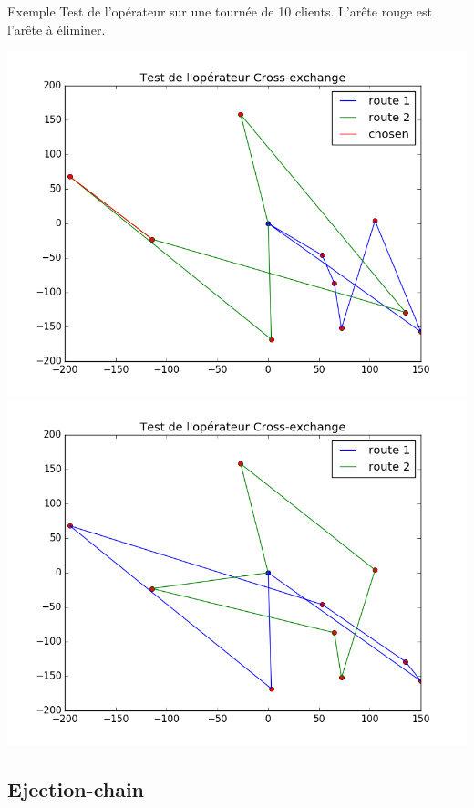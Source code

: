 \documentclass{beamer}
\begin{document}
\begin{frame}{Exemple}
Test de l'opérateur sur une tournée de 10 clients. L'arête rouge est l'arête à éliminer.

\begin{center}
\includegraphics[scale=0.28]{test2CE_init.png}
\includegraphics[scale=0.28]{test2CE_imp.png}
\end{center}

\end{frame}



\subsection{Ejection-chain}
\end{document}
